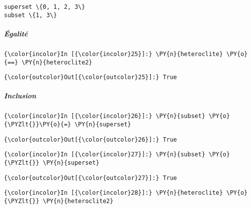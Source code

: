     \begin{Verbatim}[commandchars=\\\{\}]
superset \{0, 1, 2, 3\}
subset \{1, 3\}

    \end{Verbatim}

    \hypertarget{uxe9galituxe9}{%
\subparagraph{Égalité}\label{uxe9galituxe9}}

    \begin{Verbatim}[commandchars=\\\{\}]
{\color{incolor}In [{\color{incolor}25}]:} \PY{n}{heteroclite} \PY{o}{==} \PY{n}{heteroclite2}
\end{Verbatim}


\begin{Verbatim}[commandchars=\\\{\}]
{\color{outcolor}Out[{\color{outcolor}25}]:} True
\end{Verbatim}
            
    \hypertarget{inclusion}{%
\subparagraph{Inclusion}\label{inclusion}}

    \begin{Verbatim}[commandchars=\\\{\}]
{\color{incolor}In [{\color{incolor}26}]:} \PY{n}{subset} \PY{o}{\PYZlt{}}\PY{o}{=} \PY{n}{superset}
\end{Verbatim}


\begin{Verbatim}[commandchars=\\\{\}]
{\color{outcolor}Out[{\color{outcolor}26}]:} True
\end{Verbatim}
            
    \begin{Verbatim}[commandchars=\\\{\}]
{\color{incolor}In [{\color{incolor}27}]:} \PY{n}{subset} \PY{o}{\PYZlt{}} \PY{n}{superset}
\end{Verbatim}


\begin{Verbatim}[commandchars=\\\{\}]
{\color{outcolor}Out[{\color{outcolor}27}]:} True
\end{Verbatim}
            
    \begin{Verbatim}[commandchars=\\\{\}]
{\color{incolor}In [{\color{incolor}28}]:} \PY{n}{heteroclite} \PY{o}{\PYZlt{}} \PY{n}{heteroclite2}
\end{Verbatim}


